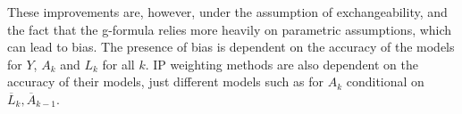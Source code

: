 These improvements are, however, under the assumption of exchangeability, and the fact that the g-formula relies more heavily on parametric assumptions, which can lead to bias.  The presence of bias is dependent on the accuracy of the models for $Y$, $A_k$ and $L_k$ for all $k$.  IP weighting methods are also dependent on the accuracy of their models, just different models such as for $A_k$ conditional on $\overline{L}_k, \overline{A}_{k-1}$.  


